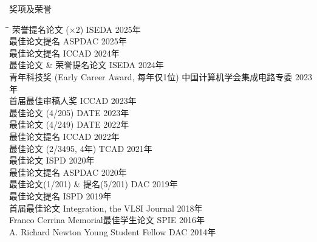 
\begin{rSection}{奖项及荣誉}
\begin{tabbing}
\hspace{3.3in}\= \hspace{2.7in}\= \kill
荣誉提名论文 ($\times$2) \> ISEDA \> { 2025年 } \\
最佳论文提名 \> ASPDAC \> { 2025年 } \\
最佳论文提名 \> ICCAD \> { 2024年 } \\
最佳论文 \& 荣誉提名论文 \> ISEDA \> { 2024年 } \\
青年科技奖 (Early Career Award, 每年仅1位) \> 中国计算机学会集成电路专委 \> { 2023年 } \\
首届最佳审稿人奖 \> ICCAD \> { 2023年 } \\
最佳论文 (4/205) \> DATE \> { 2023年 } \\
最佳论文 (4/249) \> DATE \> { 2022年 } \\
最佳论文提名 \> ICCAD \> { 2022年 } \\
最佳论文 (2/3495, 4年) \> TCAD \> { 2021年 } \\
最佳论文 \> ISPD \> { 2020年 } \\
最佳论文提名 \> ASPDAC \> { 2020年 } \\
最佳论文(1/201) \& 提名(5/201) \> DAC \> { 2019年 } \\
最佳论文提名 \> ISPD \> { 2019年 } \\
首届最佳论文 \> Integration, the VLSI Journal \> { 2018年 } \\
Franco Cerrina Memorial最佳学生论文 \> SPIE \> { 2016年 } \\
A. Richard Newton Young Student Fellow \> DAC \> { 2014年 } \\
\end{tabbing}
\end{rSection}

